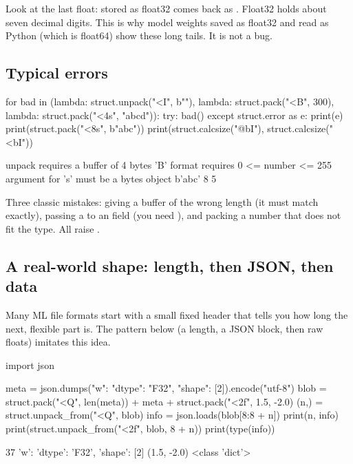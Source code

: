 Look at the last float:  stored as float32 comes back as
. Float32 holds about seven decimal digits. This is why model weights
saved as float32 and read as Python  (which is float64) show these long tails. It is
not a bug.

\subsection{Typical errors}

\begin{pycode}
for bad in (lambda: struct.unpack("<I", b""),
            lambda: struct.pack("<B", 300),
            lambda: struct.pack("<4s", "abcd")):
    try:
        bad()
    except struct.error as e:
        print(e)
print(struct.pack("<8s", b"abc"))
print(struct.calcsize("@bI"), struct.calcsize("<bI"))
\end{pycode}
\begin{rawcode}
unpack requires a buffer of 4 bytes
'B' format requires 0 <= number <= 255
argument for 's' must be a bytes object
b'abc'
8 5
\end{rawcode}

\begin{trap}
Three classic mistakes: giving  a buffer of the wrong length (it must match
 exactly), passing a  to an  field (you need ), and
packing a number that does not fit the type. All raise .
\end{trap}

\subsection{A real-world shape: length, then JSON, then data}

Many ML file formats start with a small fixed header that tells you how long the next, flexible
part is. The pattern below (a length, a JSON block, then raw floats) imitates this idea.

\begin{pycode}
import json

meta = json.dumps({"w": {"dtype": "F32", "shape": [2]}}).encode("utf-8")
blob = struct.pack("<Q", len(meta)) + meta + struct.pack("<2f", 1.5, -2.0)
(n,) = struct.unpack_from("<Q", blob)
info = json.loads(blob[8:8 + n])
print(n, info)
print(struct.unpack_from("<2f", blob, 8 + n))
print(type(info))
\end{pycode}
\begin{rawcode}
37 {'w': {'dtype': 'F32', 'shape': [2]}}
(1.5, -2.0)
<class 'dict'>
\end{rawcode}


